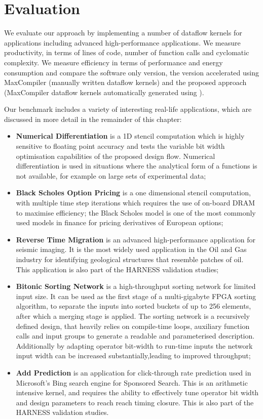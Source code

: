 \chapter{Evaluation}
\label{sec:evaluation}

We evaluate our approach by implementing a number of dataflow kernels
for applications including advanced high-performance applications. We
measure productivity, in terms of lines of code, number of function
calls and cyclomatic complexity. We measure efficiency in terms of
performance and energy consumption and compare the software only
version, the version accelerated using MaxCompiler (manually written
dataflow kernels) and the proposed approach (MaxCompiler dataflow
kernels automatically generated using \fastc{}).

\label{sec:benchmark}

Our benchmark includes a variety of interesting real-life
applications, which are discussed in more detail in the remainder of
this chapter:
\begin{itemize}
\item \textbf{Numerical Differentiation} is a 1D stencil computation which
  is highly sensitive to floating point accuracy and tests the
  variable bit width optimisation capabilities of the proposed design
  flow. Numerical differentiation is used in situations where the
  analytical form of a functions is not available, for example on
  large sets of experimental data;
\item \textbf{Black Scholes Option Pricing} is a one dimensional
    stencil computation, with multiple time step iterations which
    requires the use of on-board DRAM to maximise efficiency; the Black
    Scholes model is one of the most commonly used models in finance for
    pricing derivatives of European options;
\item \textbf{Reverse Time Migration} is an advanced high-performance
  application for seismic imaging. It is the most widely used
  application in the Oil and Gas industry for identifying geological
  structures that resemble patches of oil. This application is also
  part of the HARNESS validation studies;
\item \textbf{Bitonic Sorting Network} is a high-throughput sorting
  network for limited input size. It can be used as the first stage of
  a multi-gigabyte FPGA sorting algorithm, to separate the inputs into
  sorted buckets of up to 256 elements, after which a merging stage is
  applied. The sorting network is a recursively defined design, that
  heavily relies on compile-time loops, auxiliary function calls and
  input groups to generate a readable and parameterised
  description. Additionally by adapting operator bit-width to run-time
  inputs the network input width can be increased
  substantially,leading to improved throughput;
\item \textbf{Add Prediction} is an application for click-through rate
  prediction used in Microsoft's Bing search engine for Sponsored
  Search. This is an arithmetic intensive kernel, and requires the
  ability to effectively tune operator bit width and design parameters
  to reach reach timing closure. This is also part of the HARNESS
  validation studies.
\end{itemize}

